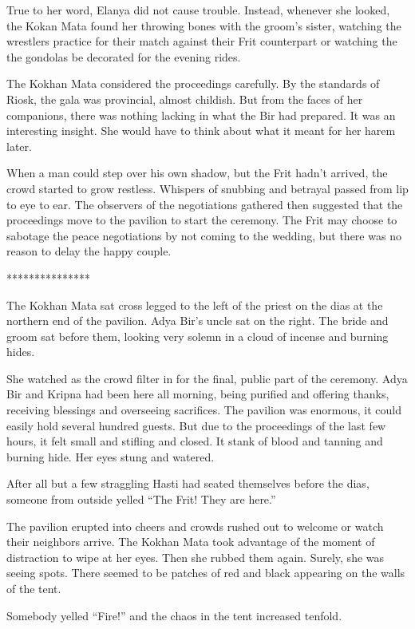 \documentclass{article}
\begin{document}
	True to her word, Elanya did not cause trouble. Instead, whenever she looked, the Kokan Mata found her throwing bones with the groom’s sister, watching the wrestlers practice for their match against their Frit counterpart or watching the the gondolas be decorated for the evening rides.
	
	The Kokhan Mata considered the proceedings carefully. By the standards of Riosk, the gala was provincial, almost childish. But from the faces of her companions, there was nothing lacking in what the Bir had prepared. It was an interesting insight. She would have to think about what it meant for her harem later.
	
	When a man could step over his own shadow, but the Frit hadn't arrived, the crowd started to grow restless. Whispers of snubbing and betrayal passed from lip to eye to ear. The observers of the negotiations gathered then suggested that the proceedings move to the pavilion to start the ceremony. The Frit may choose to sabotage the peace negotiations by not coming to the wedding, but there was no reason to delay the happy couple. 
	
	***************
	
	The Kokhan Mata sat cross legged to the left of the priest on the dias at the northern end of the pavilion. Adya Bir’s uncle sat on the right. The bride and groom sat before them, looking very solemn in a cloud of incense and burning hides. 
	
	She watched as the crowd filter in for the final, public part of the ceremony. Adya Bir and Kripna had been here all morning, being purified and offering thanks, receiving blessings and overseeing sacrifices. The pavilion was enormous, it could easily hold several hundred guests. But due to the proceedings of the last few hours, it felt small and stifling and closed. It stank of blood and tanning and burning hide. Her eyes stung and watered.
	
	After all but a few straggling Hasti had seated themselves before the dias, someone from outside yelled “The Frit! They are here.” 
	
	The pavilion erupted into cheers and crowds rushed out to welcome or watch their neighbors arrive. The Kokhan Mata took advantage of the moment of distraction to wipe at her eyes. Then she rubbed them again. Surely, she was seeing spots. There seemed to be patches of red and black appearing on the walls of the tent.
	
	Somebody yelled “Fire!” and the chaos in the tent increased tenfold.
	
\end{document}
